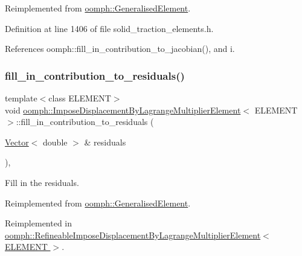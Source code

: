 Reimplemented from \hyperlink{classoomph_1_1GeneralisedElement_a2b6294a730647cf865da94f2531466f8}{oomph\+::\+Generalised\+Element}.



Definition at line 1406 of file solid\+\_\+traction\+\_\+elements.\+h.



References oomph\+::fill\+\_\+in\+\_\+contribution\+\_\+to\+\_\+jacobian(), and i.

\mbox{\label{classoomph_1_1ImposeDisplacementByLagrangeMultiplierElement_a1c65bc4013288cba24313e4cd1339919}} 
\subsubsection{\texorpdfstring{fill\+\_\+in\+\_\+contribution\+\_\+to\+\_\+residuals()}{fill\_in\_contribution\_to\_residuals()}}
{\footnotesize\ttfamily template$<$class E\+L\+E\+M\+E\+NT$>$ \\
void \hyperlink{classoomph_1_1ImposeDisplacementByLagrangeMultiplierElement}{oomph\+::\+Impose\+Displacement\+By\+Lagrange\+Multiplier\+Element}$<$ E\+L\+E\+M\+E\+NT $>$\+::fill\+\_\+in\+\_\+contribution\+\_\+to\+\_\+residuals (\begin{DoxyParamCaption}\item[{\hyperlink{classoomph_1_1Vector}{Vector}$<$ double $>$ \&}]{residuals }\end{DoxyParamCaption})\hspace{0.3cm}{\ttfamily [inline]}, {\ttfamily [virtual]}}



Fill in the residuals. 



Reimplemented from \hyperlink{classoomph_1_1GeneralisedElement_a310c97f515e8504a48179c0e72c550d7}{oomph\+::\+Generalised\+Element}.



Reimplemented in \hyperlink{classoomph_1_1RefineableImposeDisplacementByLagrangeMultiplierElement_a31ed3e9bd0d168fb2278add70062dac2}{oomph\+::\+Refineable\+Impose\+Displacement\+By\+Lagrange\+Multiplier\+Element$<$ E\+L\+E\+M\+E\+N\+T $>$}.



